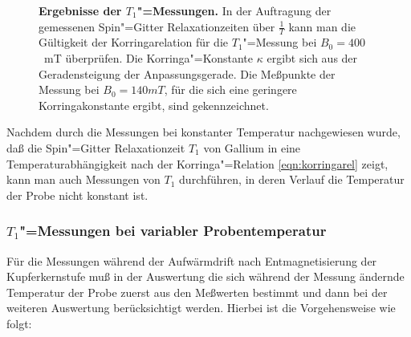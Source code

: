 \begin{figure}[htp]
	\caption[Ergebnisse der $T_1$"=Messungen mit Anpassung an die
		Korringarelation]{{\upshape\bfseries Ergebnisse der $T_1$"=Messungen.} In der Auftragung der
		gemessenen Spin"=Gitter Relaxationzeiten über $\frac1{T}$ kann man die Gültigkeit der
		Korringarelation für die $T_1$"=Messung bei $B_0=400$~mT überprüfen. Die Korringa"=Konstante
		$\kappa$ ergibt sich aus der Geradensteigung der Anpassungsgerade. Die Meßpunkte der
		Messung bei $B_0=140mT$, für die sich eine geringere Korringakonstante ergibt, sind gekennzeichnet.}
	\label{fig:t1korringa}
 \end{figure}

Nachdem durch die Messungen bei konstanter Temperatur nachgewiesen wurde, daß die
Spin"=Gitter Relaxationzeit $T_1$ von Gallium in \aug{} eine Temperaturabhängigkeit nach der
Korringa"=Relation \eqref{eqn:korringarel} zeigt, kann man auch Messungen von $T_1$ durchführen,
in deren Verlauf die Temperatur der Probe nicht konstant ist.

\subsubsection{$T_1$"=Messungen bei variabler Probentemperatur}

Für die Messungen während der Aufwärmdrift nach Entmagnetisierung der Kupferkernstufe muß in der
Auswertung die sich während der Messung ändernde Temperatur der Probe zuerst aus den Meßwerten
bestimmt und dann bei der weiteren Auswertung berücksichtigt werden. Hierbei ist die
Vorgehensweise wie folgt:

